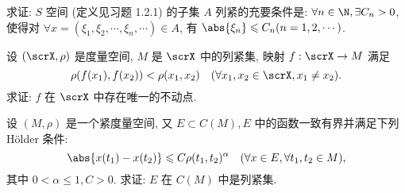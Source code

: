 \begin{exercise}
  求证: $S$ 空间 (定义见习题 1.2.1) 的子集 $A$ 列紧的充要条件是: 
    $\forall n \in \N, \exists C_{n} > 0$, 使得对 $\forall x = (\xi_{1}, \xi_{2}, \cdots, \xi_{n}, \cdots) \in A$, 有 $\abs{\xi_{n}} \leqslant C_{n}(n = 1, 2, \cdots)$.
\end{exercise}

\begin{exercise}
  设 $(\scrX, \rho)$ 是度量空间, $M$ 是 $\scrX$ 中的列紧集, 映射 $f: \scrX \rightarrow M$ 满足
    \[
      \rho(f(x_{1}), f(x_{2})) < \rho(x_{1}, x_{2}) \quad(\forall x_{1}, x_{2} \in \scrX, x_{1} \neq x_{2}) .
    \]
  求证: $f$ 在 $\scrX$ 中存在唯一的不动点.
\end{exercise}

\begin{exercise}
  设 $(M, \rho)$ 是一个紧度量空间, 又 $E \subset C(M), E$ 中的函数一致有界并满足下列 Hölder 条件:
    \[
      \abs{x(t_{1})-x(t_{2})} \leqslant C \rho(t_{1}, t_{2})^{\alpha} \quad(\forall x \in E, \forall t_{1}, t_{2} \in M),
    \]
  其中 $0 < \alpha \leqslant 1, C > 0$. 求证: $E$ 在 $C(M)$ 中是列紧集.
\end{exercise}